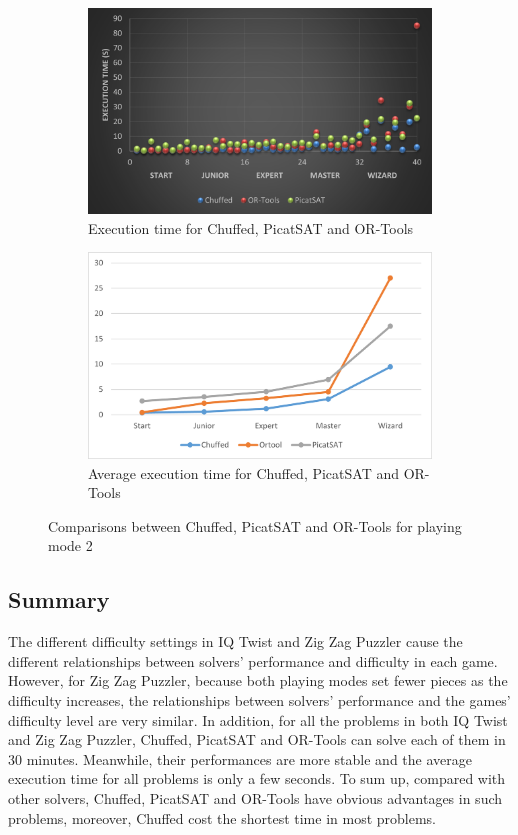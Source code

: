 \begin{figure}[H]
\begin{subfigure}[b]{0.48\textwidth}
  \centering
    \includegraphics[width=\textwidth]{figs/time2three.png}
    \caption{Execution time for Chuffed, PicatSAT and OR-Tools}
\end{subfigure}
\begin{subfigure}[b]{0.48\textwidth}
 \centering
    \includegraphics[width=\textwidth]{figs/Threecomparison2.png}
    \caption{Average execution time for Chuffed, PicatSAT and OR-Tools}
\end{subfigure}
\caption{Comparisons between Chuffed, PicatSAT and OR-Tools for playing mode 2}
\label{fig:comparisonlast}
\end{figure}
\subsection{Summary}
\label{sec:Summary}
The different difficulty settings in IQ Twist and Zig Zag Puzzler cause the different relationships between solvers' performance and difficulty in each game. However, for Zig Zag Puzzler, because both playing modes set fewer pieces as the difficulty increases, the relationships between solvers' performance and the games' difficulty level are very similar. In addition, for all the problems in both IQ Twist and Zig Zag Puzzler, Chuffed, PicatSAT and OR-Tools can solve each of them in 30 minutes. Meanwhile, their performances are more stable and the average execution time for all problems is only a few seconds. To sum up, compared with other solvers, Chuffed, PicatSAT and OR-Tools have obvious advantages in such problems, moreover, Chuffed cost the shortest time in most problems. 
 